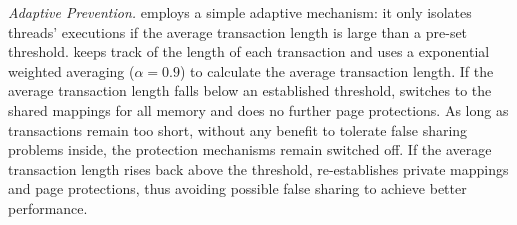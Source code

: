 \emph{Adaptive Prevention.}
\SheriffProtect{} employs a simple adaptive mechanism: it only isolates threads' executions if the average transaction length is large than a pre-set threshold. \SheriffProtect{} keeps track of the length of each transaction and uses a exponential weighted averaging ($\alpha = 0.9$) to calculate the average transaction length. If the average transaction length falls below an established threshold, \SheriffProtect{} switches to the shared mappings for all memory and does no further page protections. As long as transactions remain too short, 
 without any benefit to tolerate false sharing problems inside, the protection mechanisms remain switched off. If the average transaction length rises back above the threshold, \SheriffProtect{} re-establishes private mappings and page protections, thus avoiding possible false sharing to achieve better performance.